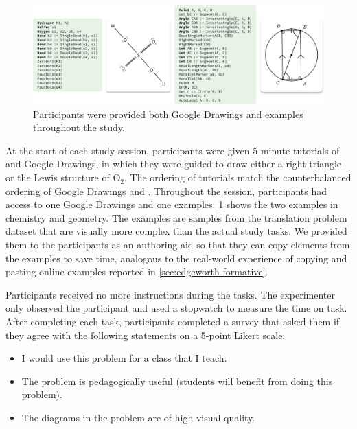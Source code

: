 
\begin{figure}
    \centering
    \includegraphics[width=\linewidth]{assets/edgeworth-eval/user-study-examples.pdf}
    \caption{Participants were provided both Google Drawings and \Substance examples throughout the study.}
    \label{fig:edgeworth-user-study-examples}
\end{figure}

At the start of each study session, participants were given 5-minute tutorials of \Edgeworth and Google Drawings, in which they were guided to draw either a right triangle or the Lewis structure of \ensuremath{\mathrm{O_2}}. The ordering of tutorials match the counterbalanced ordering of Google Drawings and \Edgeworth. Throughout the session, participants had access to one Google Drawings and one \Substance examples. \cref{fig:edgeworth-user-study-examples} shows the two examples in chemistry and geometry. The examples are samples from the translation problem dataset that are visually more complex than the actual study tasks. We provided them to the participants as an authoring aid so that they can copy elements from the examples to save time, analogous to the real-world experience of copying and pasting online examples reported in \cref{sec:edgeworth-formative}.

Participants received no more instructions during the tasks. The experimenter only observed the participant and used a stopwatch to measure the time on task. After completing each task, participants completed a survey that asked them if they agree with the following statements on a 5-point Likert scale:

\begin{itemize}
  \item I would use this problem for a class that I
teach.
  \item The problem is pedagogically useful (\ie students will benefit from doing this problem).  
  \item The diagrams in the problem are of high visual quality.
\end{itemize}

